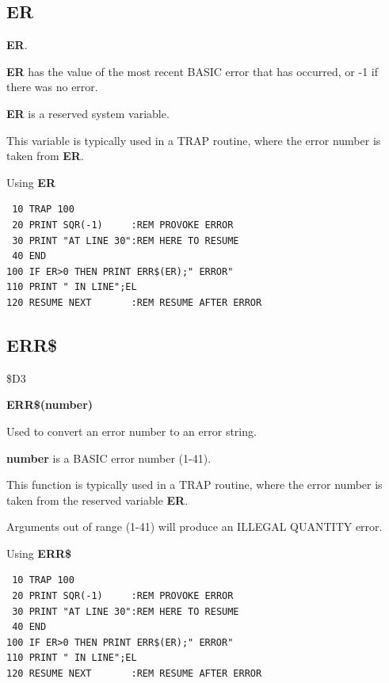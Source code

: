 \subsection{ER}
\begin{description}[leftmargin=2cm,style=nextline]
\item [Format:] {\bf ER}.
\item [Usage:]  {\bf ER} has the value of the most recent BASIC error that has
               occurred, or -1 if there was no error.
\item [Remarks:] {\bf ER} is a reserved system variable.

This variable is typically used in a TRAP routine,
where the error number is taken from {\bf ER}.

\item [Example:] Using {\bf ER}
\begin{tcolorbox}[colback=black,coltext=white]
\verbatimfont{\codefont}
\begin{verbatim}
 10 TRAP 100
 20 PRINT SQR(-1)     :REM PROVOKE ERROR
 30 PRINT "AT LINE 30":REM HERE TO RESUME
 40 END
100 IF ER>0 THEN PRINT ERR$(ER);" ERROR"
110 PRINT " IN LINE";EL
120 RESUME NEXT       :REM RESUME AFTER ERROR
\end{verbatim}
\end{tcolorbox}
\end{description}


\newpage
\subsection{ERR\$}
\begin{description}[leftmargin=2cm,style=nextline]
\item [Token:] \$D3
\item [Format:] {\bf ERR\$(number)}
\item [Usage:] Used to convert
               an error number to an error string.

   {\bf number} is a BASIC error number (1-41).

This function is typically used in a TRAP routine,
where the error number is taken from the reserved variable {\bf ER}.

\item [Remarks:] Arguments out of range (1-41) will
                 produce an ILLEGAL QUANTITY error.

\item [Example:] Using {\bf ERR\$}
\begin{tcolorbox}[colback=black,coltext=white]
\verbatimfont{\codefont}
\begin{verbatim}
 10 TRAP 100
 20 PRINT SQR(-1)     :REM PROVOKE ERROR
 30 PRINT "AT LINE 30":REM HERE TO RESUME
 40 END
100 IF ER>0 THEN PRINT ERR$(ER);" ERROR"
110 PRINT " IN LINE";EL
120 RESUME NEXT       :REM RESUME AFTER ERROR
\end{verbatim}
\end{tcolorbox}
\end{description}

